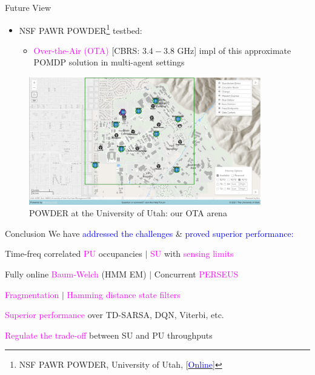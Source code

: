 \documentclass{beamer}
\begin{document}
\begin{frame}{Future View}
    \begin{itemize}
        \item \footnotesize{NSF PAWR POWDER\footnote{\tiny{NSF PAWR POWDER, University of Utah, [\href{http://docs.powderwireless.net/}{\textcolor{blue}{Online}}]}} testbed}:
        \begin{itemize}
            \item \footnotesize{\textcolor{magenta}{Over-the-Air (OTA)} [CBRS: $3.4{-}3.8$ GHz] impl of this approximate POMDP solution in multi-agent settings}
        \end{itemize}
    \end{itemize}
    \begin{figure}
        \centering
        \includegraphics[width = 0.9\textwidth]{figs/POWDER.PNG}
        \caption{POWDER at the University of Utah: our OTA arena}
        \label{fig:5d}
    \end{figure}
\end{frame}
\begin{frame}{Conclusion}
We have \textcolor{blue}{addressed the challenges} \& \textcolor{blue}{proved superior performance:}\\
\begin{itemize}
    \footnotesize{
    \item Time-freq correlated \textcolor{magenta}{PU} occupancies $|$ \textcolor{magenta}{SU} with \textcolor{magenta}{sensing limits}
    \item Fully online \textcolor{magenta}{Baum-Welch} (HMM EM) $|$ Concurrent \textcolor{magenta}{PERSEUS}
    \item \textcolor{magenta}{Fragmentation} $|$ \textcolor{magenta}{Hamming distance state filters}
    \item \textcolor{magenta}{Superior performance} over TD-SARSA, DQN, Viterbi, etc.
    \item \textcolor{magenta}{Regulate the trade-off} between SU and PU throughputs}
\end{itemize}
\end{frame}
\end{document}
